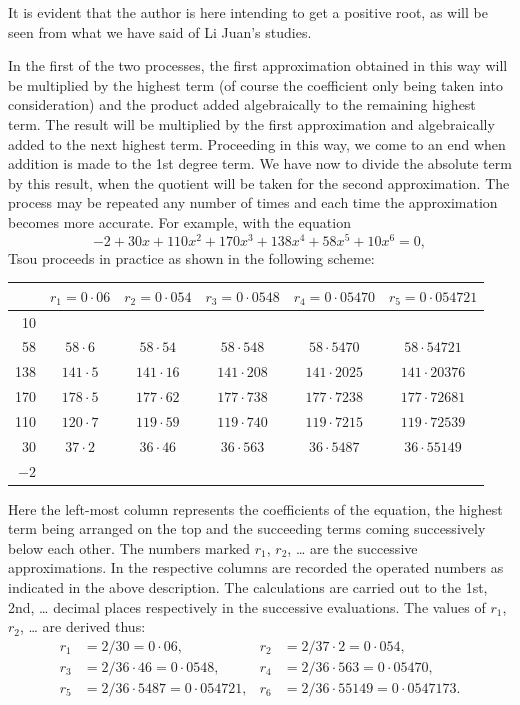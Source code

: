 \documentclass[11pt]{article}
\newcommand{\scanpage}[2]{\clearpage\setcounter{footnote}{0}\noindent{\footnotesize\color{gray}PDF page #1 · #2}\par\medskip}
\newcommand{\scanfooter}{}
\begin{document}
It is evident that the author is here intending to get a positive root, as will be seen from what we have said of Li Juan's studies.

In the first of the two processes, the first approximation obtained in this way will be multiplied by the highest term (of course the coefficient only being taken into consideration) and the product added algebraically to the remaining highest term. The result will be multiplied by the first approximation and algebraically added to the next highest term. Proceeding in this way, we come to an end when addition is made to the 1st degree term. We have now to divide the absolute term by this result, when the quotient will be taken for the second approximation. The process may be repeated any number of times and each time the approximation becomes more accurate. For example, with the equation
\[
-2+30x+110x^2+170x^3+138x^4+58x^5+10x^6=0,
\]
Tsou proceeds in practice as shown in the following scheme:

\begin{center}
\small
\renewcommand{\arraystretch}{1.12}
\begin{tabular}{|r|c|c|c|c|c|}
\hline
& $r_1=0\cdot 06$ & $r_2=0\cdot 054$ & $r_3=0\cdot 0548$ & $r_4=0\cdot 05470$ & $r_5=0\cdot 054721$ \\
\hline
10  & & & & & \\
58  & $58\cdot 6$ & $58\cdot 54$ & $58\cdot 548$ & $58\cdot 5470$ & $58\cdot 54721$ \\
138 & $141\cdot 5$ & $141\cdot 16$ & $141\cdot 208$ & $141\cdot 2025$ & $141\cdot 20376$ \\
170 & $178\cdot 5$ & $177\cdot 62$ & $177\cdot 738$ & $177\cdot 7238$ & $177\cdot 72681$ \\
110 & $120\cdot 7$ & $119\cdot 59$ & $119\cdot 740$ & $119\cdot 7215$ & $119\cdot 72539$ \\
30  & $37\cdot 2$ & $36\cdot 46$ & $36\cdot 563$ & $36\cdot 5487$ & $36\cdot 55149$ \\
$-2$ & & & & & \\
\hline
\end{tabular}
\end{center}
\scanfooter

\scanpage{0145}{Chapter 19, printed page 131}
Here the left-most column represents the coefficients of the equation, the highest term being arranged on the top and the succeeding terms coming successively below each other. The numbers marked $r_1$, $r_2$, \ldots{} are the successive approximations. In the respective columns are recorded the operated numbers as indicated in the above description. The calculations are carried out to the 1st, 2nd, \ldots{} decimal places respectively in the successive evaluations. The values of $r_1$, $r_2$, \ldots{} are derived thus:
\[
\begin{aligned}
r_1&=2/30=0\cdot 06, & r_2&=2/37\cdot 2=0\cdot 054,\\
r_3&=2/36\cdot 46=0\cdot 0548, & r_4&=2/36\cdot 563=0\cdot 05470,\\
r_5&=2/36\cdot 5487=0\cdot 054721, & r_6&=2/36\cdot 55149=0\cdot 0547173.
\end{aligned}
\]
\end{document}
